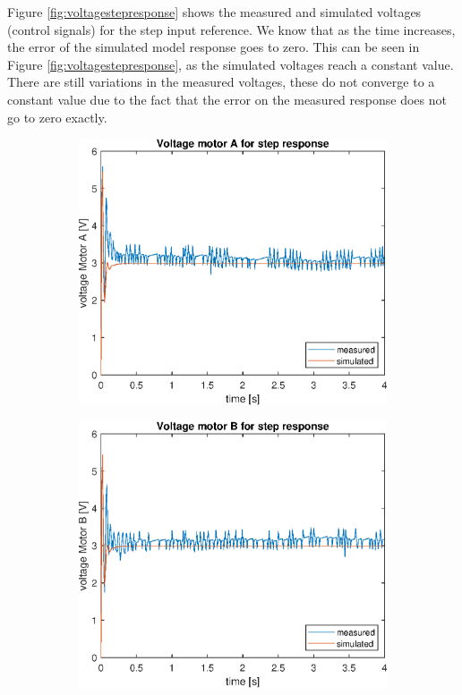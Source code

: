 \documentclass[a4paper,kul]{kulakarticle} %
\begin{document}
Figure \ref{fig:voltagestepresponse} shows the measured and simulated voltages (control signals) for the step input reference. We know that as the time increases, the error of the simulated model response goes to zero. This can be seen in Figure \ref{fig:voltagestepresponse}, as the simulated voltages reach a constant value. There are still variations in the measured voltages, these do not converge to a constant value due to the fact that the error on the measured response does not go to zero exactly.
\begin{figure}[htp!]
	\centering
	\begin{subfigure}[b]{0.49\textwidth}
		\centering
		\includegraphics[width=\linewidth]{comparison_voltage_stepresponseA.eps}
		
	\end{subfigure}
	\hfill
	\begin{subfigure}[b]{0.49\textwidth}  
		\centering
		\includegraphics[width=\linewidth]{comparison_voltage_stepresponseB.eps}
		

\end{subfigure}
\end{figure}
\end{document}
